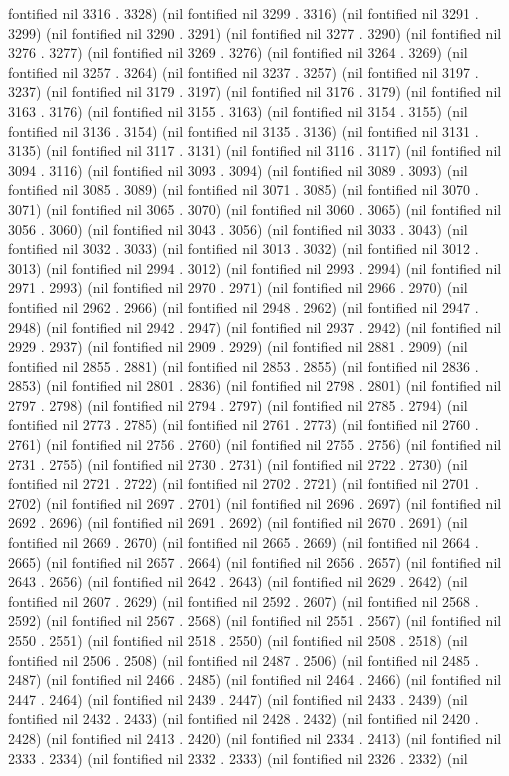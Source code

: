 fontified nil 3316 . 3328) (nil fontified nil 3299 . 3316) (nil fontified nil 3291 . 3299) (nil fontified nil 3290 . 3291) (nil fontified nil 3277 . 3290) (nil fontified nil 3276 . 3277) (nil fontified nil 3269 . 3276) (nil fontified nil 3264 . 3269) (nil fontified nil 3257 . 3264) (nil fontified nil 3237 . 3257) (nil fontified nil 3197 . 3237) (nil fontified nil 3179 . 3197) (nil fontified nil 3176 . 3179) (nil fontified nil 3163 . 3176) (nil fontified nil 3155 . 3163) (nil fontified nil 3154 . 3155) (nil fontified nil 3136 . 3154) (nil fontified nil 3135 . 3136) (nil fontified nil 3131 . 3135) (nil fontified nil 3117 . 3131) (nil fontified nil 3116 . 3117) (nil fontified nil 3094 . 3116) (nil fontified nil 3093 . 3094) (nil fontified nil 3089 . 3093) (nil fontified nil 3085 . 3089) (nil fontified nil 3071 . 3085) (nil fontified nil 3070 . 3071) (nil fontified nil 3065 . 3070) (nil fontified nil 3060 . 3065) (nil fontified nil 3056 . 3060) (nil fontified nil 3043 . 3056) (nil fontified nil 3033 . 3043) (nil fontified nil 3032 . 3033) (nil fontified nil 3013 . 3032) (nil fontified nil 3012 . 3013) (nil fontified nil 2994 . 3012) (nil fontified nil 2993 . 2994) (nil fontified nil 2971 . 2993) (nil fontified nil 2970 . 2971) (nil fontified nil 2966 . 2970) (nil fontified nil 2962 . 2966) (nil fontified nil 2948 . 2962) (nil fontified nil 2947 . 2948) (nil fontified nil 2942 . 2947) (nil fontified nil 2937 . 2942) (nil fontified nil 2929 . 2937) (nil fontified nil 2909 . 2929) (nil fontified nil 2881 . 2909) (nil fontified nil 2855 . 2881) (nil fontified nil 2853 . 2855) (nil fontified nil 2836 . 2853) (nil fontified nil 2801 . 2836) (nil fontified nil 2798 . 2801) (nil fontified nil 2797 . 2798) (nil fontified nil 2794 . 2797) (nil fontified nil 2785 . 2794) (nil fontified nil 2773 . 2785) (nil fontified nil 2761 . 2773) (nil fontified nil 2760 . 2761) (nil fontified nil 2756 . 2760) (nil fontified nil 2755 . 2756) (nil fontified nil 2731 . 2755) (nil fontified nil 2730 . 2731) (nil fontified nil 2722 . 2730) (nil fontified nil 2721 . 2722) (nil fontified nil 2702 . 2721) (nil fontified nil 2701 . 2702) (nil fontified nil 2697 . 2701) (nil fontified nil 2696 . 2697) (nil fontified nil 2692 . 2696) (nil fontified nil 2691 . 2692) (nil fontified nil 2670 . 2691) (nil fontified nil 2669 . 2670) (nil fontified nil 2665 . 2669) (nil fontified nil 2664 . 2665) (nil fontified nil 2657 . 2664) (nil fontified nil 2656 . 2657) (nil fontified nil 2643 . 2656) (nil fontified nil 2642 . 2643) (nil fontified nil 2629 . 2642) (nil fontified nil 2607 . 2629) (nil fontified nil 2592 . 2607) (nil fontified nil 2568 . 2592) (nil fontified nil 2567 . 2568) (nil fontified nil 2551 . 2567) (nil fontified nil 2550 . 2551) (nil fontified nil 2518 . 2550) (nil fontified nil 2508 . 2518) (nil fontified nil 2506 . 2508) (nil fontified nil 2487 . 2506) (nil fontified nil 2485 . 2487) (nil fontified nil 2466 . 2485) (nil fontified nil 2464 . 2466) (nil fontified nil 2447 . 2464) (nil fontified nil 2439 . 2447) (nil fontified nil 2433 . 2439) (nil fontified nil 2432 . 2433) (nil fontified nil 2428 . 2432) (nil fontified nil 2420 . 2428) (nil fontified nil 2413 . 2420) (nil fontified nil 2334 . 2413) (nil fontified nil 2333 . 2334) (nil fontified nil 2332 . 2333) (nil fontified nil 2326 . 2332) (nil 